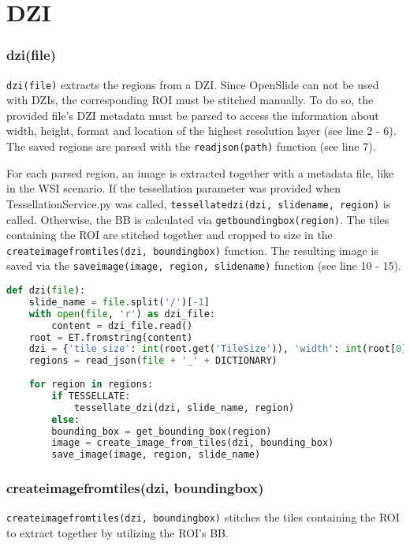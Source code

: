 \section{DZI}

\subsubsection{dzi(file)}
\texttt{dzi(file)} extracts the regions from a DZI. Since OpenSlide can not be used with DZIs, the corresponding ROI must be stitched manually. To do so, the provided file's DZI metadata must be parsed to access the information about width, height, format and location of the highest resolution layer (see line 2 - 6). The saved regions are parsed with the \texttt{read{\textunderscore}json(path)} function (see line 7).

For each parsed region, an image is extracted together with a metadata file, like in the WSI scenario. If the tessellation parameter was provided when TessellationService.py was called, \texttt{tessellate{\textunderscore}dzi(dzi, slide{\textunderscore}name, region)} is called. Otherwise, the BB is calculated via \texttt{get{\textunderscore}bounding{\textunderscore}box(region)}. The tiles containing the ROI are stitched together and cropped to size in the \texttt{create{\textunderscore}image{\textunderscore}from{\textunderscore}tiles(dzi, bounding{\textunderscore}box)} function. The resulting image is saved via the \texttt{save{\textunderscore}image(image, region, slide{\textunderscore}name)} function (see line 10 - 15).

\begin{lstlisting}[frame=single,language=python]
def dzi(file):
	slide_name = file.split('/')[-1]
	with open(file, 'r') as dzi_file:
		content = dzi_file.read()
	root = ET.fromstring(content)
	dzi = {'tile_size': int(root.get('TileSize')), 'width': int(root[0].get('Width')), 'height': int(root[0].get('Height')), 'tile_source': get_tile_source(file), 'format': root.get('Format')}
	regions = read_json(file + '_' + DICTIONARY)
	
	for region in regions:
		if TESSELLATE:
			tessellate_dzi(dzi, slide_name, region)
		else:
		bounding_box = get_bounding_box(region)
		image = create_image_from_tiles(dzi, bounding_box)
		save_image(image, region, slide_name)
\end{lstlisting}


\subsubsection{create{\textunderscore}image{\textunderscore}from{\textunderscore}tiles(dzi, bounding{\textunderscore}box)}
\texttt{create{\textunderscore}image{\textunderscore}from{\textunderscore}tiles(dzi, bounding{\textunderscore}box)} stitches the tiles containing the ROI to extract together by utilizing the ROI's BB.

